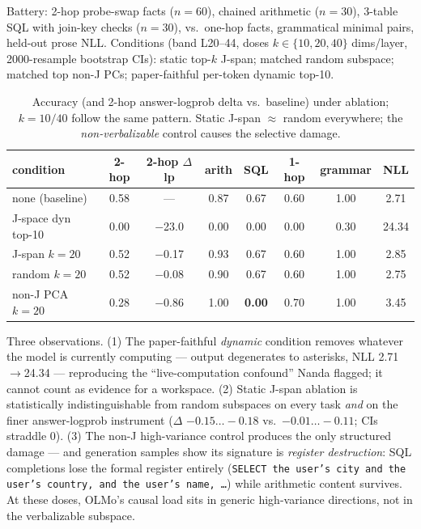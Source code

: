 \documentclass[10pt]{article}
\newcommand{\code}[1]{\texttt{#1}}
\begin{document}
Battery: 2-hop probe-swap facts ($n{=}60$), chained arithmetic ($n{=}30$),
3-table SQL with join-key checks ($n{=}30$), vs.\ one-hop facts, grammatical
minimal pairs, held-out prose NLL. Conditions (band L20--44, doses
$k\in\{10,20,40\}$ dims/layer, 2000-resample bootstrap CIs): static top-$k$
J-span; matched random subspace; matched top non-J PCs; paper-faithful
per-token dynamic top-10.

\begin{table}[htbp]
\centering\small
\begin{tabular}{lccccccc}
\toprule
condition & 2-hop & 2-hop $\Delta$lp & arith & SQL & 1-hop & grammar & NLL \\
\midrule
none (baseline)        & 0.58 & ---            & 0.87 & 0.67 & 0.60 & 1.00 & 2.71 \\
J-space dyn top-10     & 0.00 & $-$23.0        & 0.00 & 0.00 & 0.00 & 0.30 & 24.34 \\
J-span $k{=}20$        & 0.52 & $-$0.17        & 0.93 & 0.67 & 0.60 & 1.00 & 2.85 \\
random $k{=}20$        & 0.52 & $-$0.08        & 0.90 & 0.67 & 0.60 & 1.00 & 2.75 \\
non-J PCA $k{=}20$     & 0.28 & $\mathbf{-0.86}$ & 1.00 & \textbf{0.00} & 0.70 & 1.00 & 3.45 \\
\bottomrule
\end{tabular}
\caption{Accuracy (and 2-hop answer-logprob delta vs.\ baseline) under
ablation; $k{=}10/40$ follow the same pattern. Static J-span $\approx$ random
everywhere; the \emph{non-verbalizable} control causes the selective damage.}
\end{table}

Three observations. (1) The paper-faithful \emph{dynamic} condition removes
whatever the model is currently computing --- output degenerates to asterisks,
NLL 2.71$\to$24.34 --- reproducing the ``live-computation confound'' Nanda
flagged; it cannot count as evidence for a workspace. (2) Static J-span
ablation is statistically indistinguishable from random subspaces on every
task \emph{and} on the finer answer-logprob instrument
($\Delta$ $-0.15\ldots-0.18$ vs.\ $-0.01\ldots-0.11$; CIs straddle 0).
(3) The non-J high-variance control produces the only structured damage ---
and generation samples show its signature is \emph{register destruction}: SQL
completions lose the formal register entirely (\code{SELECT the user's city
and the user's country, and the user's name, \ldots}) while arithmetic
content survives. At these doses, OLMo's causal load sits in generic
high-variance directions, not in the verbalizable subspace.
\end{document}
